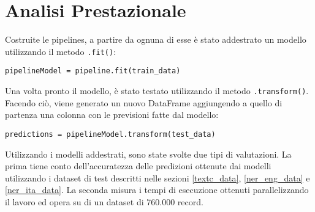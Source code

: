 \section{Analisi Prestazionale}
Costruite le pipelines, a partire da ognuna di esse è stato addestrato un modello utilizzando il metodo \verb|.fit()|:
\begin{center}
    \verb|pipelineModel = pipeline.fit(train_data)|
\end{center}
Una volta pronto il modello, è stato testato utilizzando il metodo \verb|.transform()|. Facendo ciò, viene generato un nuovo DataFrame aggiungendo a quello di partenza una colonna con le previsioni fatte dal modello:
\begin{center}
    \verb|predictions = pipelineModel.transform(test_data)|
\end{center}
Utilizzando i modelli addestrati, sono state svolte due tipi di valutazioni. La prima tiene conto dell'accuratezza delle predizioni ottenute dai modelli utilizzando i dataset di test descritti nelle sezioni \ref{textc_data}, \ref{ner_eng_data} e \ref{ner_ita_data}. La seconda misura i tempi di esecuzione ottenuti parallelizzando il lavoro ed opera su di un dataset di 760.000 record.

\newpage

\clearpage

